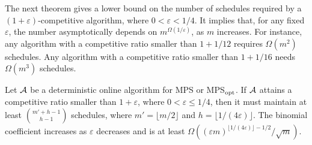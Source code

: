 \documentclass{llncs}
\newcommand{\eps}{\varepsilon}
\begin{document}
The next theorem gives a lower bound on the number of schedules required by a $(1+\eps)$-competitive algorithm,
where $0<\eps < 1/4$. It implies that, for any fixed $\eps$, the number asymptotically depends on 
$m^{\Omega(1/\eps)}$, as $m$ increases. For instance, any algorithm with a competitive ratio
smaller than $1+{1/ 12}$ requires $\Omega(m^2)$ schedules.  Any algorithm with a competitive ratio
smaller than $1+{1/ 16}$ needs $\Omega(m^3)$ schedules.
\begin{theorem}\label{th:lb2}
Let ${\cal A}$ be a deterministic online algorithm for MPS or MPS$_{\rm opt}$. If ${\cal A}$ attains a competitive 
ratio smaller than $1+\eps$, where $0<\eps \leq 1/4$, then it must maintain at least ${m'+h-1 \choose h-1}$
schedules, where $m' = \lfloor m/2 \rfloor$ and $h = \lfloor 1/(4\eps)\rfloor$. The binomial coefficient
increases as $\eps$ decreases and is at least $\Omega((\eps m)^{\lfloor 1/(4\eps)\rfloor-1/2}/\sqrt{m})$.
\end{theorem}
\end{document}
